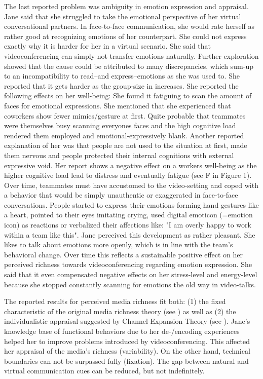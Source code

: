 \documentclass[man]{apa7}
\begin{document}
The last reported problem was ambiguity in emotion expression and appraisal. Jane said that she struggled to take the emotional perspective of her virtual conversational partners. In face-to-face communication, she would rate herself as rather good at recognizing emotions of her counterpart. She could not express exactly why it is harder for her in a virtual scenario. She said that videoconferencing can simply not transfer emotions naturally. Further exploration showed that the cause could be attributed to many discrepancies, which sum-up to an incompatibility to read–and express–emotions as she was used to. She reported that it gets harder as the group-size in increases. She reported the following effects on her well-being: She found it fatiguing to scan the amount of faces for emotional expressions. She mentioned that she experienced that coworkers show fewer mimics/gesture at first. Quite probable that teammates were themselves busy scanning everyones faces and the high cognitive load rendered them employed and emotional-expressively blank. Another reported explanation of her was that people are not used to the situation at first, made them nervous and people protected their internal cognitions with external expressive void. Her report shows a negative effect on a workers well-being as the higher cognitive load lead to distress and eventually fatigue (see F in Figure 1). Over time, teammates must have accustomed to the video-setting and coped with a behavior that would be simply unauthentic or exaggerated in face-to-face conversations. People started to express their emotions forming hand gestures like a heart, pointed to their eyes imitating crying, used digital emoticon (=emotion icon) as reactions or verbalized their affections like: "I am overly happy to work within a team like this". Jane perceived this development as rather pleasant. She likes to talk about emotions more openly, which is in line with the team's behavioral change. Over time this reflects a sustainable positive effect on her perceived richness towards videoconferencing regarding emotion expression. She said that it even compensated negative effects on her stress-level and energy-level because she stopped constantly scanning for emotions the old way in video-talks.

The reported results for perceived media richness fit both: (1) the fixed characteristic of the original media richness theory (see \cite{daft1983information}) as well as (2) the individualistic appraisal suggested by Channel Expansion Theory (see \cite{Carlson1999}). Jane's knowledge base of functional behaviors due to her de-/encoding experiences helped her to improve problems introduced by videoconferencing. This affected her appraisal of the media's richness (variability). On the other hand, technical boundaries can not be surpassed fully (fixation). The gap between natural and virtual communication cues can be reduced, but not indefinitely.
\end{document}
